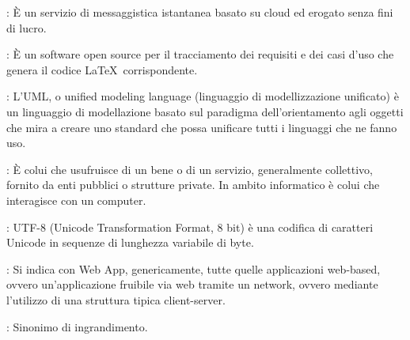 {		: È un servizio di messaggistica istantanea basato su cloud ed erogato senza fini di lucro.
		
		: È un software open source per il tracciamento dei requisiti e dei casi d'uso che genera il codice \LaTeX\ corrispondente.


		: L'UML, o unified modeling language (linguaggio di modellizzazione unificato) è un linguaggio di modellazione basato sul paradigma dell'orientamento agli oggetti
che mira a creare uno standard che possa unificare tutti i linguaggi che ne fanno uso.

		: È colui che usufruisce di un bene o di un servizio, generalmente collettivo, fornito da enti pubblici o strutture private. In ambito informatico è colui che interagisce con un computer.
	
		: UTF-8 (Unicode Transformation Format, 8 bit) è una codifica di caratteri Unicode in sequenze di lunghezza variabile di byte.


		: Si indica con Web App, genericamente, tutte quelle applicazioni web-based, ovvero un'applicazione fruibile via web tramite un network, ovvero
mediante l'utilizzo di una struttura tipica client-server.


		: Sinonimo di ingrandimento.
	 }
	 
